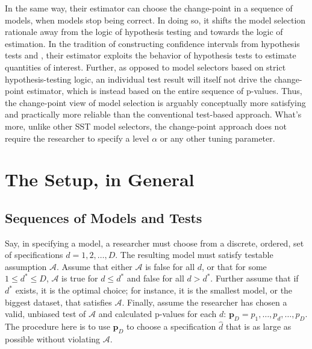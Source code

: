 \documentclass[lineno]{biometrika}\usepackage[]{graphicx}\usepackage[]{color}
\newcommand{\dstar}{d^*}
\begin{document}
In the same way, their estimator can choose the change-point in
a sequence of models, when models stop being correct.
In doing so, it shifts the model selection rationale away
from the logic of hypothesis testing and towards the logic of
estimation.
In the tradition of constructing confidence intervals from hypothesis
tests and \citet{hodgeslehmann}, their estimator exploits
the behavior of hypothesis tests to estimate quantities of interest.
Further, as opposed to model selectors based on strict
hypothesis-testing logic, an individual test result will itself not
drive the change-point estimator, which is instead based on the entire
sequence of p-values.
Thus, the change-point view of model selection is arguably conceptually
more satisfying and practically more reliable than the conventional
test-based approach.
What's more, unlike other SST model selectors, the change-point
approach does not require the researcher to specify a level $\alpha$
or any other tuning parameter.


\section{The Setup, in General}\label{sec:setup}
\subsection{Sequences of Models and Tests}
Say, in specifying a model, a researcher must choose from a discrete,
ordered, set of specifications $d=1,2,\dots,D$.
The resulting model must satisfy testable assumption $\mathcal{A}$.
Assume that either $\mathcal{A}$ is false for all $d$, or that for
some $1\le \dstar\le D$, $\mathcal{A}$ is true for $d\le \dstar$ and false
for all $d>\dstar$.
Further assume that if $\dstar$ exists, it is the optimal choice; for
instance, it is the smallest model, or the biggest dataset, that satisfies
$\mathcal{A}$.
Finally, assume the researcher has chosen a valid, unbiased test of
$\mathcal{A}$ and calculated p-values for each $d$:
$\bm{p}_D=p_1,\dots,p_d,\dots,p_D$.
The procedure here is to use $\bm{p}_D$ to choose a specification
$\hat{d}$ that is as large as possible without violating
$\mathcal{A}$.
\end{document}
